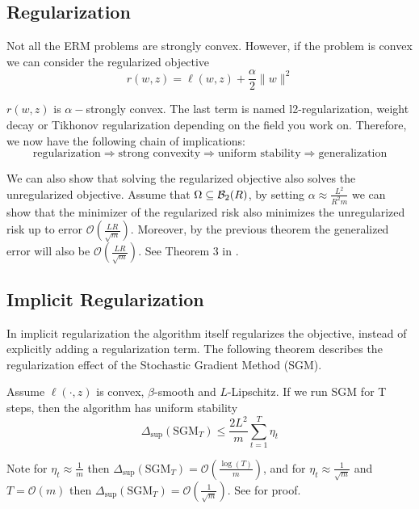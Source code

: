 \subsection{Regularization}

Not all the ERM problems are strongly convex. However, if the problem is convex we can consider the regularized objective
\begin{equation*}
r(w, z) = \ell(w, z) + \frac{\alpha}{2} \| w \|^2
\end{equation*}

$r(w, z)$ is $\alpha-$strongly convex. The last term is named l2-regularization, weight decay or Tikhonov regularization depending on the field you work on. Therefore, we now have the following chain of implications:
$$
\text{regularization} \Rightarrow \text{strong convexity} \Rightarrow \text{uniform stability} \Rightarrow \text{generalization}
$$

We can also show that solving the regularized objective also solves the unregularized objective. Assume that $\Omega \subseteq \mathcal{B}_2(R)$, by setting $\alpha \approx \frac{L^2}{R^2 m}$ we can show that the minimizer of the regularized risk also minimizes the unregularized risk up to error $\mathcal{O}(\frac{LR}{\sqrt{m}})$. Moreover, by the previous theorem the generalized error will also be $\mathcal{O}(\frac{LR}{\sqrt{m}})$. See Theorem 3 in \cite{Shalev2010LearnabilitySA}.

\subsection{Implicit Regularization}

In implicit regularization the algorithm itself regularizes the objective, instead of explicitly adding a regularization term. The following theorem describes the regularization effect of the Stochastic Gradient Method (SGM). 

\begin{theorem}Assume $\ell(\cdot, z)$ is convex, $\beta$-smooth and $L$-Lipschitz. If we run SGM for T steps, then the algorithm has uniform stability
\begin{equation*}
\Delta_{\sup}(\text{SGM}_T) \leq \frac{2 L^2}{m} \sum_{t=1}^T \eta_t
\end{equation*}
\end{theorem}
Note for $\eta_t \approx \frac{1}{m}$ then $\Delta_{\sup}(\text{SGM}_T) = \mathcal{O}(\frac{\log(T)}{m})$, and for $\eta_t \approx \frac{1}{\sqrt{m}}$ and $T=\mathcal{O}(m)$ then $\Delta_{\sup}(\text{SGM}_T) = \mathcal{O}(\frac{1}{\sqrt{m}} )$. See \cite{HardtRS15} for proof.
